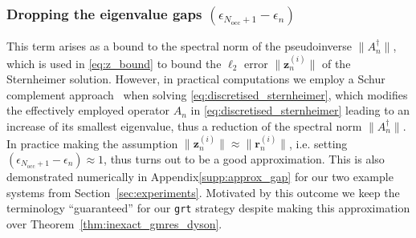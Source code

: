 \documentclass[hidelinks,onefignum,onetabnum]{siamart250211}
\newcommand{\Nocc}{N_{\mathrm{occ}}}
\newcommand{\sgrt}{\texttt{grt}\xspace}
\newcommand{\supplement}{Appendix\xspace}
\newcommand{\supplement}{Supplementary Material\xspace}
\begin{document}
\subsubsection{Dropping the eigenvalue gaps \texorpdfstring{$(\epsilon_{\Nocc + 1} - \epsilon_n)$}{epsilonDiff}}
\label{sec:approx_gap}
This term arises as a bound to the spectral norm of the pseudoinverse $\| A_n^\dagger \|$,
which is used in \eqref{eq:z_bound} to bound the $\ell_2$ error $\| \bm{z}_n^{(i)}\|$
of the Sternheimer solution.
%
%
However, in practical computations we employ
a Schur complement approach~\cite{cances2023numerical}
%
when solving \eqref{eq:discretised_sternheimer},
which modifies the effectively employed operator $A_n$
in \eqref{eq:discretised_sternheimer} leading to an increase
of its smallest eigenvalue, thus a reduction of the spectral norm $\| A_n^\dagger \|$.
In practice making the assumption
$\|\bm z_{n}^{(i)} \| \approx \| \bm r_n^{(i)} \|$,
i.e. setting $(\epsilon_{\Nocc + 1} - \epsilon_n) \approx 1$,
thus turns out to be a good approximation.
This is also demonstrated numerically in \supplement \ref{supp:approx_gap}
for our two example systems from Section~\ref{sec:experiments}.
Motivated by this outcome we keep the terminology ``guaranteed'' for our \sgrt
strategy despite making this approximation over Theorem~\ref{thm:inexact_gmres_dyson}.

%
%
%
%
%
%
%
%
%
%
%
%
%
%
%
%
%
%
%
%
%
%
%
%
%
%
%
%
%
%
%
%
\end{document}
